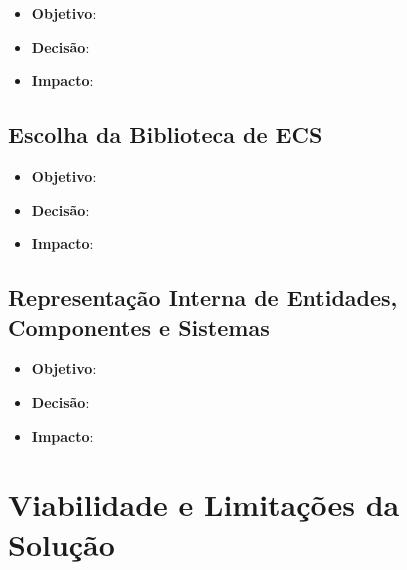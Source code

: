 \begin{itemize}
	\item \textbf{Objetivo}:
	\item \textbf{Decisão}:
	\item \textbf{Impacto}:
\end{itemize}

\subsection{Escolha da Biblioteca de ECS}

\begin{itemize}
	\item \textbf{Objetivo}:
	\item \textbf{Decisão}:
	\item \textbf{Impacto}:
\end{itemize}

\subsection{Representação Interna de Entidades, Componentes e Sistemas}

\begin{itemize}
	\item \textbf{Objetivo}:
	\item \textbf{Decisão}:
	\item \textbf{Impacto}:
\end{itemize}

\section{Viabilidade e Limitações da Solução}
